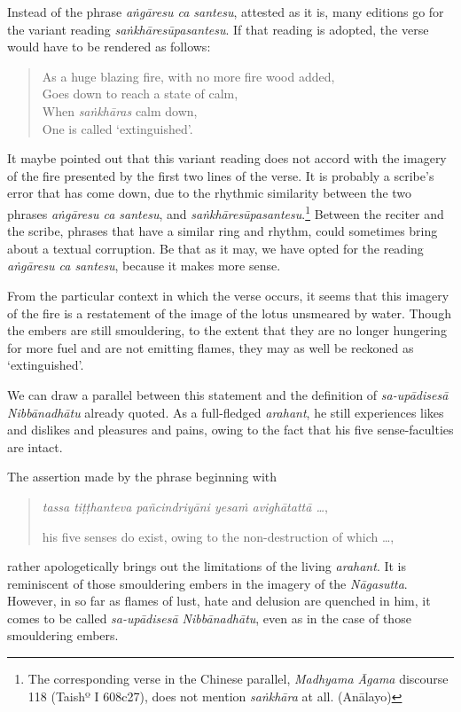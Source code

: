 Instead of the phrase \emph{aṅgāresu ca santesu}, attested as it is, many editions go for the variant reading \emph{saṅkhāresūpasantesu}. If that reading is adopted, the verse would have to be rendered as follows:

\begin{quote}
As a huge blazing fire, with no more fire wood added,\\
Goes down to reach a state of calm,\\
When \emph{saṅkhāras} calm down,\\
One is called `extinguished'.
\end{quote}

It maybe pointed out that this variant reading does not accord with the imagery of the fire presented by the first two lines of the verse. It is probably a scribe's error that has come down, due to the rhythmic similarity between the two phrases \emph{aṅgāresu ca santesu}, and \emph{saṅkhāresūpasantesu}.\footnote{The corresponding verse in the Chinese parallel, \emph{Madhyama Āgama} discourse 118 (Taishº I 608c27), does not mention \emph{saṅkhāra} at all. (Anālayo)} Between the reciter and the scribe, phrases that have a similar ring and rhythm, could sometimes bring about a textual corruption. Be that as it may, we have opted for the reading \emph{aṅgāresu ca santesu}, because it makes more sense.

From the particular context in which the verse occurs, it seems that this imagery of the fire is a restatement of the image of the lotus unsmeared by water. Though the embers are still smouldering, to the extent that they are no longer hungering for more fuel and are not emitting flames, they may as well be reckoned as `extinguished'.

We can draw a parallel between this statement and the definition of \emph{sa-upādisesā Nibbānadhātu} already quoted. As a full-fledged \emph{arahant}, he still experiences likes and dislikes and pleasures and pains, owing to the fact that his five sense-faculties are intact.

The assertion made by the phrase beginning with

\begin{quote}
\emph{tassa tiṭṭhanteva pañcindriyāni yesaṁ avighātattā \ldots{}},

his five senses do exist, owing to the non-destruction of which \ldots,
\end{quote}

rather apologetically brings out the limitations of the living \emph{arahant}. It is reminiscent of those smouldering embers in the imagery of the \emph{Nāgasutta}. However, in so far as flames of lust, hate and delusion are quenched in him, it comes to be called \emph{sa-upādisesā Nibbānadhātu}, even as in the case of those smouldering embers.


